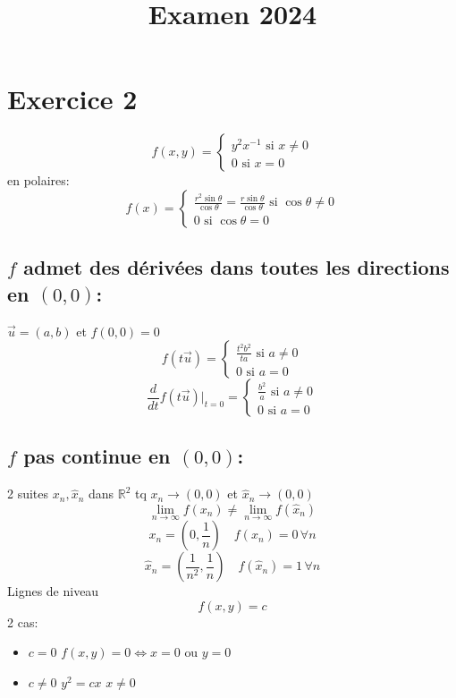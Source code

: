 \documentclass[a4paper]{article}
\title{Examen 2024}
\newcommand{\R}{\mathbb{R}}
\begin{document}
   \maketitle 
   \section*{Exercice 2}
   \[
   f(x, y) = \begin{cases}
       y^2x^{-1} \text{ si } x \neq 0\\
       0 \text{ si } x = 0
   \end{cases}
   \] 
   en polaires:
   \[
   f(x) = \begin{cases}
            \frac{r^2 \sin \theta}{\cos \theta} = \frac{r \sin \theta}{\cos \theta} \text{ si } \cos \theta \neq 0\\
            0 \text{ si } \cos \theta = 0
   \end{cases}
   \] 
   \subsection*{$f$ admet des dérivées dans toutes les directions en $(0, 0)$:}
   \par
   $\vec{u} = (a, b)$ et  $f(0, 0) = 0$
    \[
        f(t\vec{u}) = \begin{cases}
            \frac{t^2b^2}{ta} \text{ si } a \neq 0\\
            0 \text{ si } a = 0
        \end{cases}
   \] 
   \[
       \frac{d}{dt}f(t\vec{u})|_{t = 0} = \begin{cases}
           \frac{b^2}{a} \text{ si } a \neq 0\\
           0 \text{ si } a = 0
       \end{cases}
   \] 
   \par
   \subsection*{$f$ pas continue en  $(0, 0)$:}
   \par
   2 suites  $x_n, \hat{x}_n$ dans $\R^2$ tq $x_n \to (0, 0)$ et $\hat{x}_n \to (0, 0)$
   \[
   \lim_{n \to \infty} f(x_n) \neq \lim_{n \to \infty} f(\hat{x}_n)
   \] 
   \[
   x_n = (0, \frac{1}{n}) \quad f(x_n) = 0 \, \forall n
   \] 
   \[
   \hat{x}_n = (\frac{1}{n^2}, \frac{1}{n}) \quad f(\hat{x}_n)=1 \, \forall n
   \] 
   Lignes de niveau
   \[
   f(x, y) = c
   \] 
   2 cas:
   \begin{itemize}
       \item $c = 0$  $f(x, y) = 0 \iff x= 0 \text{ ou } y = 0$ 
       \item $c \neq 0$ $y^2 = cx$  $x \neq 0$
   \end{itemize}
\end{document}
